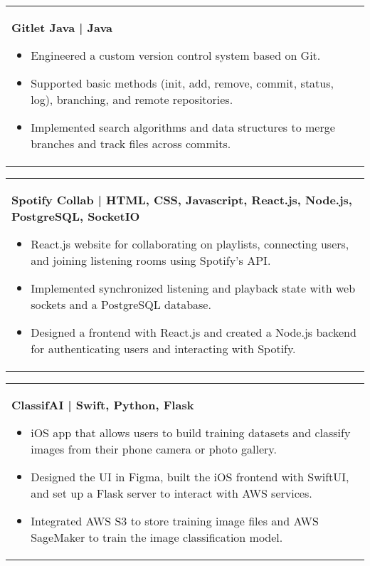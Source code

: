 \documentclass[10pt, a4paper]{article}
\newenvironment{highlights}{
        \begin{itemize}[
                topsep=0pt,
                parsep=0.10 cm,
                partopsep=0pt,
                itemsep=0pt,
                after=\vspace{-1\baselineskip},
                leftmargin=0.4 cm + 3pt
            ]
    }{
        \end{itemize}
    } %
\begin{document}
        \begin{tabularx}{ cm-0.13cm}{K{0.2 cm}}
            \textbf{Gitlet Java | Java}
            \vspace{0.10 cm}
            \begin{highlights}
                \item Engineered a custom version control system based on Git. 
                \item Supported basic methods (init, add, remove, commit, status, log), branching, and remote repositories. 
                \item Implemented search algorithms and data structures to merge branches and track files across commits. \hspace*{-0.2cm}
            \end{highlights}
        \end{tabularx}

        \vspace{0.12 cm}
        \begin{tabularx}{ cm-0.13cm}{K{0.2 cm}}
            \textbf{Spotify Collab | HTML, CSS, Javascript, React.js, Node.js, PostgreSQL, SocketIO}
            \vspace{0.10 cm}
            \begin{highlights}
                \item React.js website for collaborating on playlists, connecting users, and joining listening rooms using Spotify’s API. 
                \item Implemented synchronized listening and playback state with web sockets and a PostgreSQL database. 
                \item Designed a frontend with React.js and created a Node.js backend for authenticating users and interacting with Spotify. \hspace*{-0.2cm}
            \end{highlights}
        \end{tabularx}

        \vspace{0.12 cm}
        \begin{tabularx}{ cm-0.13cm}{K{0.2 cm}}
            \textbf{ClassifAI | Swift, Python, Flask}
            \vspace{0.10 cm}
            \begin{highlights}
                \item iOS app that allows users to build training datasets and classify images from their phone camera or photo gallery. 
                \item Designed the UI in Figma, built the iOS frontend with SwiftUI, and set up a Flask server to interact with AWS services. 
                \item Integrated AWS S3 to store training image files and AWS SageMaker to train the image classification model. \hspace*{-0.2cm}
            \end{highlights}
        \end{tabularx}
\end{document}
